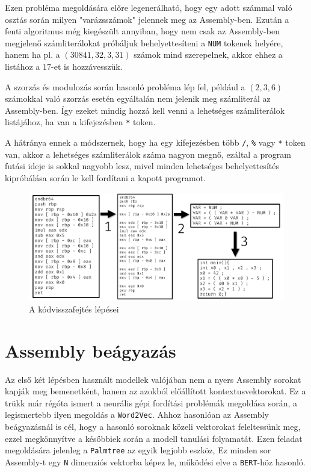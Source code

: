 Ezen probléma megoldására előre legenerálható, hogy egy adott számmal való
osztás során milyen "varázsszámok" jelennek meg az Assembly-ben. Ezután a fenti
algoritmus még kiegészült annyiban, hogy nem csak az Assembly-ben
megjelenő számliterálokat próbáljuk behelyettesíteni a \texttt{NUM} tokenek
helyére, hanem ha pl. a $(30841, 32, 3, 31)$ számok mind szerepelnek, akkor ehhez a listához
a $17$-et is hozzávesszük.

A szorzás és modulozás során hasonló probléma lép fel, például a $(2, 3, 6)$
számokkal való szorzás esetén egyáltalán nem jelenik meg számliterál az
Assembly-ben. Így ezeket mindig hozzá kell venni a lehetséges számliterálok
listájához, ha van a kifejezésben \texttt{*} token.

A hátránya ennek a módszernek, hogy ha egy kifejezésben több \texttt{/},
\texttt{\%} vagy \texttt{*} token van, akkor a lehetséges számliterálok száma
nagyon megnő, ezáltal a program futási ideje is sokkal nagyobb lesz, mivel
minden lehetséges behelyettesítés kipróbálása során le kell fordítani
a kapott programot.

\begin{figure}[H]
	\centering
	\includegraphics[width=1\textwidth]{images/steps.pdf}
	\caption{A kódvisszafejtés lépései}
	\label{fig:steps}
\end{figure}

\section{Assembly beágyazás}
Az első két lépésben használt modellek valójában nem a nyers Assembly sorokat
kapják meg bemenetként, hanem az azokból előállított kontextusvektorokat. Ez
a trükk már régóta ismert a neurális gépi fordítási problémák megoldása során,
a legismertebb ilyen megoldás a \texttt{Word2Vec}\cite{word2vec}. Ahhoz hasonlóan az
Assembly beágyazásnál is cél, hogy a hasonló soroknak közeli vektorokat
feleltessünk meg, ezzel megkönnyítve a későbbiek során a modell tanulási
folyamatát. Ezen feladat megoldására jelenleg a \texttt{Palmtree}\cite{palmtree} az egyik legjobb eszköz,
Ez minden sor Assembly-t egy \texttt{N} dimenziós vektorba képez le, működési elve
a \texttt{BERT}\cite{bert}-höz hasonló.